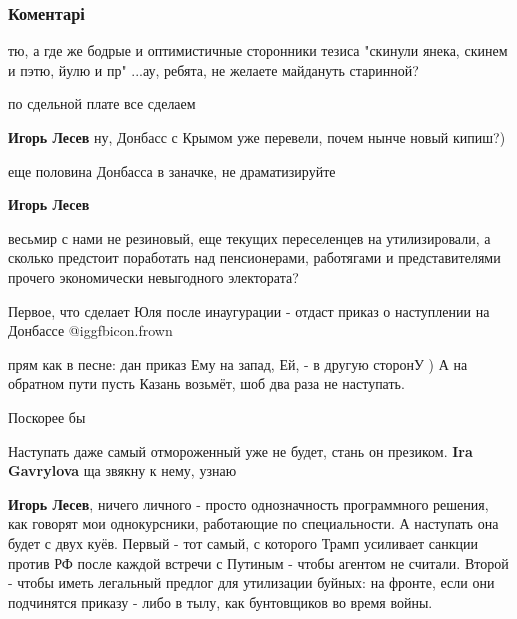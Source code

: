 
 
 
 
 
\subsubsection{Коментарі}

\begin{itemize} %

тю, а где же бодрые и оптимистичные сторонники тезиса "скинули янека, скинем и
пэтю, йулю и пр" ...ау, ребята, не желаете майдануть старинной?

\begin{itemize} %
по сдельной плате все сделаем

\textbf{Игорь Лесев} ну, Донбасс с Крымом уже перевели, почем нынче новый кипиш?)

еще половина Донбасса в заначке, не драматизируйте

\textbf{Игорь Лесев} 

весьмир с нами не резиновый, еще текущих переселенцев на утилизировали, а сколько
предстоит поработать над пенсионерами, работягами и представителями прочего
экономически невыгодного электората?

\end{itemize} %

Первое, что сделает Юля после инаугурации - отдаст приказ о наступлении на Донбассе  @igg{fbicon.frown} 

\begin{itemize} %
прям как в песне: дан приказ Ему на запад, Ей, - в другую сторонУ )
А на обратном пути пусть Казань возьмёт, шоб два раза не наступать.

Поскорее бы

Наступать даже самый отмороженный уже не будет, стань он презиком.
\textbf{Ira Gavrylova} ща звякну к нему, узнаю

\textbf{Игорь Лесев}, ничего личного - просто однозначность программного решения, как говорят мои однокурсники, работающие по специальности.
А наступать она будет с двух куёв. Первый - тот самый, с которого Трамп усиливает санкции против РФ после каждой встречи с Путиным - чтобы агентом не считали. Второй - чтобы иметь легальный предлог для утилизации буйных: на фронте, если они подчинятся приказу - либо в тылу, как бунтовщиков во время войны.


\end{itemize}
\end{itemize}
